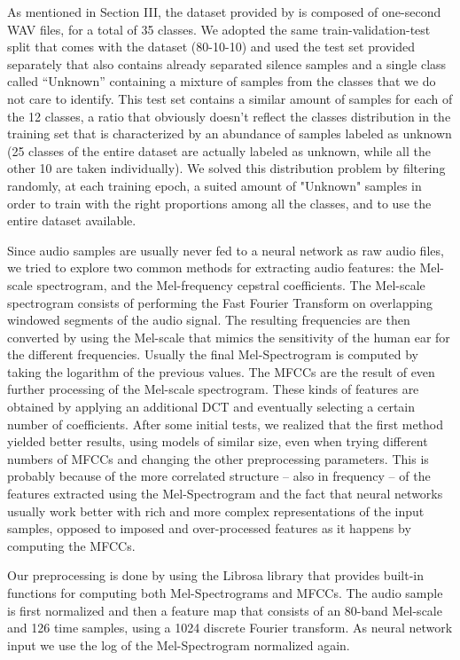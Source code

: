 As mentioned in Section III, the dataset provided by \cite{5} is composed of one-second WAV files, for a total of 35 classes. We adopted the same train-validation-test split that comes with the dataset (80-10-10) and used the test set provided separately \cite{6} that also contains already separated silence samples and a single class called ``Unknown'' containing a mixture of samples from the classes that we do not care to identify.
This test set contains a similar amount of samples for each of the 12 classes, a ratio that obviously doesn't reflect the classes distribution in the training set that is characterized by an abundance of samples labeled as unknown (25 classes of the entire dataset are actually labeled as unknown, while all the other 10 are taken individually). We solved this distribution problem by filtering randomly, at each training epoch, a suited amount of "Unknown" samples in order to train with the right proportions among all the classes, and to use the entire dataset available.


Since audio samples are usually never fed to a neural network as raw audio files, we tried to explore two common methods for extracting audio features: the Mel-scale spectrogram, and the Mel-frequency cepstral coefficients.
The Mel-scale spectrogram consists of performing the Fast Fourier Transform on overlapping windowed segments of the audio signal. The resulting frequencies are then converted by using the Mel-scale that mimics the sensitivity of the human ear for the different frequencies. Usually the final Mel-Spectrogram is computed by taking the logarithm of the previous values.
The MFCCs are the result of even further processing of the Mel-scale spectrogram. These kinds of features are obtained by applying an additional DCT and eventually selecting a certain number of coefficients.
After some initial tests, we realized that the first method yielded better results, using models of similar size, even when trying different numbers of MFCCs and changing the other preprocessing parameters. This is probably because of the more correlated structure -- also in frequency -- of the features extracted using the Mel-Spectrogram and the fact that neural networks usually work better with rich and more complex representations of the input samples, opposed to imposed and over-processed features as it happens by computing the MFCCs.


Our preprocessing is done by using the Librosa library \cite{7} that provides built-in functions for computing both Mel-Spectrograms and MFCCs. The audio sample is first normalized and then a feature map that consists of an 80-band Mel-scale and 126 time samples, using a 1024 discrete Fourier transform. As neural network input we use the log of the Mel-Spectrogram normalized again.


